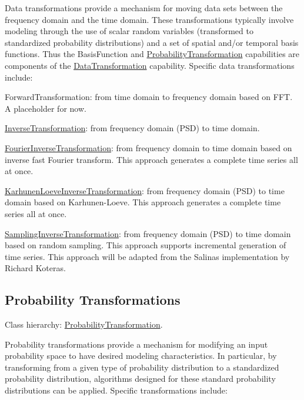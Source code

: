 Data transformations provide a mechanism for moving data sets between the frequency domain and the time domain. These transformations typically involve modeling through the use of scalar random variables (transformed to standardized probability distributions) and a set of spatial and/or temporal basis functions. Thus the Basis\+Function and \hyperlink{classPecos_1_1ProbabilityTransformation}{Probability\+Transformation} capabilities are components of the \hyperlink{classPecos_1_1DataTransformation}{Data\+Transformation} capability. Specific data transformations include\+:


\begin{DoxyItemize}
\item Forward\+Transformation\+: from time domain to frequency domain based on F\+FT. A placeholder for now.


\item \hyperlink{classPecos_1_1InverseTransformation}{Inverse\+Transformation}\+: from frequency domain (P\+SD) to time domain. 
\begin{DoxyItemize}
\item \hyperlink{classPecos_1_1FourierInverseTransformation}{Fourier\+Inverse\+Transformation}\+: from frequency domain to time domain based on inverse fast Fourier transform. This approach generates a complete time series all at once. 
\item \hyperlink{classPecos_1_1KarhunenLoeveInverseTransformation}{Karhunen\+Loeve\+Inverse\+Transformation}\+: from frequency domain (P\+SD) to time domain based on Karhunen-\/\+Loeve. This approach generates a complete time series all at once. 
\item \hyperlink{classPecos_1_1SamplingInverseTransformation}{Sampling\+Inverse\+Transformation}\+: from frequency domain (P\+SD) to time domain based on random sampling. This approach supports incremental generation of time series. This approach will be adapted from the Salinas implementation by Richard Koteras. 
\end{DoxyItemize}
\end{DoxyItemize}\hypertarget{index_DevProbTrans}{}\subsection{Probability Transformations}\label{index_DevProbTrans}
Class hierarchy\+: \hyperlink{classPecos_1_1ProbabilityTransformation}{Probability\+Transformation}.

Probability transformations provide a mechanism for modifying an input probability space to have desired modeling characteristics. In particular, by transforming from a given type of probability distribution to a standardized probability distribution, algorithms designed for these standard probability distributions can be applied. Specific transformations include\+:


